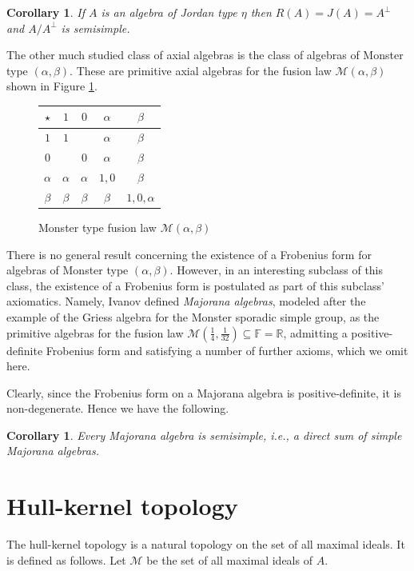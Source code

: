\documentclass[12pt]{article}
\newtheorem{corollary}[theorem]{Corollary}
\newcommand\F{\mathbb{F}}
\newcommand\R{\mathbb{R}}
\newcommand\cM{\mathcal{M}}
\newcommand\al{\alpha}
\newcommand\bt{\beta}
\begin{document}
\begin{corollary}
If $A$ is an algebra of Jordan type $\eta$ then $R(A)=J(A)=A^\perp$ and $A/A^\perp$ 
is semisimple.
\end{corollary}

The other much studied class of axial algebras is the class of algebras of Monster 
type $(\al,\bt)$. These are primitive axial algebras for the fusion law 
$\cM(\al,\bt)$ shown in Figure \ref{Monster type}.
%
\begin{figure}[ht]
\renewcommand{\arraystretch}{1.6}
\begin{center}
\begin{tabular}{|c||c|c|c|c|}
\hline
$\star$ & $1$ &$0$&$\alpha$& $\beta$\\
\hline \hline
$1$&$1$&&$\al$&$\bt$\\
\hline
$0$&&$0$&$\al$&$\bt$\\
\hline
$\al$&$\al$&$\al$&$1,0$&$\bt$\\
\hline
$\bt$&$\bt$&$\bt$&$\bt$&$1,0,\al$\\
\hline
\end{tabular}
\end{center}
\caption{Monster type fusion law $\cM(\al,\bt)$}\label{Monster type}
\end{figure}
%
There is no general result concerning the existence of a Frobenius form for algebras 
of Monster type $(\al,\bt)$. However, in an interesting subclass of this class, the 
existence of a Frobenius form is postulated as part of this subclass' axiomatics. 
Namely, Ivanov defined \emph{Majorana algebras}, modeled after the example of the 
Griess algebra for the Monster sporadic simple group, as the primitive algebras for 
the fusion law $\cM(\frac{1}{4},\frac{1}{32})\subseteq \F=\R$, admitting a 
positive-definite Frobenius form and satisfying a number of further axioms, which we 
omit here.

Clearly, since the Frobenius form on a Majorana algebra is positive-definite, it is 
non-degenerate. Hence we have the following.

\begin{corollary}
Every Majorana algebra is semisimple, i.e., a direct sum of simple Majorana algebras.
\end{corollary}

\section{Hull-kernel topology}

The hull-kernel topology is a natural topology on the set of all maximal ideals. It 
is defined as follows. Let $\cM$ be the set of all maximal ideals of $A$.
\end{document}
